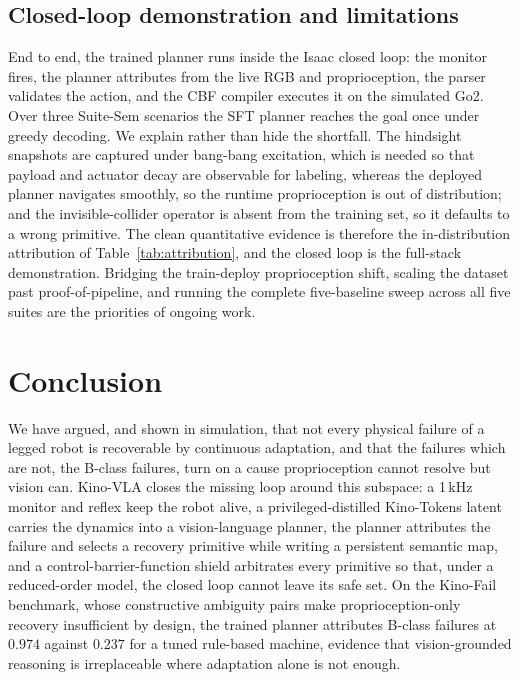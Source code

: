 \documentclass[conference]{IEEEtran}
\newcommand{\kinovla}{Kino-VLA}
\newcommand{\kinofail}{Kino-Fail}
\newcommand{\kinotokens}{Kino-Tokens}
\begin{document}
\subsection{Closed-loop demonstration and limitations}
End to end, the trained planner runs inside the Isaac closed loop: the monitor
fires, the planner attributes from the live RGB and proprioception, the parser
validates the action, and the CBF compiler executes it on the simulated Go2. Over
three Suite-Sem scenarios the SFT planner reaches the goal once under greedy
decoding. We explain rather than hide the shortfall. The hindsight snapshots are
captured under bang-bang excitation, which is needed so that payload and actuator
decay are observable for labeling, whereas the deployed planner navigates smoothly,
so the runtime proprioception is out of distribution; and the invisible-collider
operator is absent from the training set, so it defaults to a wrong primitive. The
clean quantitative evidence is therefore the in-distribution attribution of
Table~\ref{tab:attribution}, and the closed loop is the full-stack demonstration.
Bridging the train-deploy proprioception shift, scaling the dataset past
proof-of-pipeline, and running the complete five-baseline sweep across all five
suites are the priorities of ongoing work.

\section{Conclusion}
\label{sec:conclusion}

We have argued, and shown in simulation, that not every physical failure of a
legged robot is recoverable by continuous adaptation, and that the failures which
are not, the B-class failures, turn on a cause proprioception cannot resolve but
vision can. \kinovla{} closes the missing loop around this subspace: a \mbox{1\,kHz}
monitor and reflex keep the robot alive, a privileged-distilled \kinotokens{} latent
carries the dynamics into a vision-language planner, the planner attributes the
failure and selects a recovery primitive while writing a persistent semantic map,
and a control-barrier-function shield arbitrates every primitive so that, under a
reduced-order model, the closed loop cannot leave its safe set. On the \kinofail{}
benchmark, whose constructive ambiguity pairs make proprioception-only recovery
insufficient by design, the trained planner attributes B-class failures at $0.974$
against $0.237$ for a tuned rule-based machine, evidence that vision-grounded
reasoning is irreplaceable where adaptation alone is not enough.
\end{document}
